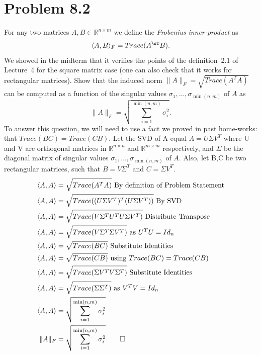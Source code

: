 \documentclass[12pt,twoside]{article}
\newcommand{\R}{\mathbb{R}}
\newcommand{\Tr}{Trace}
\begin{document}
\vspace{5mm}

\section{Problem 8.2}
	For any two matrices $A,B \in \R^{n\times m}$ we define the \emph{Frobenius inner-product} as
	$$
	\langle A,B \rangle_{F} = \Tr(A^{\sT} B).
	$$
	We showed in the midterm that it verifies the points of the definition~2.1 of Lecture~4 for the square matrix case (one can also check that it works for rectangular matrices). Show that the induced norm $\|A\|_F = \sqrt{\Tr(A^T A)}$ can be computed as a function of the singular values $\sigma_1, \dots, \sigma_{\min(n,m)}$ of $A$ as
			$$
			\|A\|_F = \sqrt{\sum_{i=1}^{\min(n,m)} \sigma_i^2}
			.$$
To answer this question, we will need to use a fact we proved in past home-works: that $Trace(BC) = Trace(CB)$.  Let the SVD of A equal $A=U\Sigma V^T$ where U and V are orthogonal matrices in $\R^{n\times n}$ and $\R^{m \times m}$ respectively, and $\Sigma$ be the diagonal matrix of singular values $\sigma_1, \dots, \sigma_{\min(n,m)}$ of $A$. Also, let B,C be two rectangular matrices, such that $B=V\Sigma^T$ and $C=\Sigma V^T$.
\begin{equation}
    \begin{split}
        \langle A,A\rangle &= \sqrt{Trace(A^TA)} \text{ By definition of Problem Statement} \\
        \langle A,A\rangle &= \sqrt{Trace((U\Sigma V^T)^T(U\Sigma V^T))} \text{ By SVD} \\
        \langle A,A\rangle &= \sqrt{Trace(V\Sigma^TU^T U\Sigma V^T)} \text{ Distribute Transpose} \\
        \langle A,A\rangle &= \sqrt{Trace(V\Sigma^T\Sigma V^T)} \text{ as } U^TU = Id_n \\
        \langle A,A\rangle &= \sqrt{Trace(BC)} \text{ Substitute Identities }   \\
        \langle A,A\rangle &= \sqrt{Trace(CB)} \text{ using } Trace(BC)=Trace(CB)    \\
        \langle A,A\rangle &= \sqrt{Trace(\Sigma V^TV\Sigma^T)} \text{ Substitute Identities } \\
        \langle A,A\rangle &= \sqrt{Trace(\Sigma\Sigma^T)} \text{ as } V^TV = Id_n\\
        \langle A,A\rangle &= \sqrt{\sum_{i=1}^{\min(n,m)} \sigma_i^2} \\
        \|A\|_F &= \sqrt{\sum_{i=1}^{\min(n,m)} \sigma_i^2} \qed
    \end{split}
\end{equation}
\end{document}
